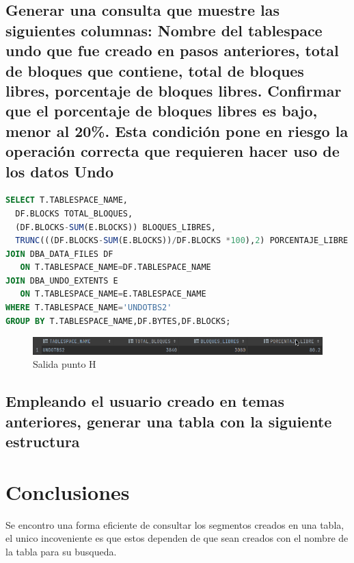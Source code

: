 \documentclass[journal]{IEEEtran}
\begin{document}
\subsection{Generar una consulta que muestre las siguientes columnas: Nombre del tablespace undo que fue creado en pasos anteriores, total de bloques que
contiene, total de bloques libres, porcentaje de bloques libres. Confirmar que el porcentaje de bloques libres es bajo, menor al 20\%. Esta condición
pone en riesgo la operación correcta que requieren hacer uso de los datos Undo}
\begin{lstlisting}[language=sql, caption=sentencia consulta tablespace bloques libres,label={lst:codigo4}]
SELECT T.TABLESPACE_NAME,
  DF.BLOCKS TOTAL_BLOQUES,
  (DF.BLOCKS-SUM(E.BLOCKS)) BLOQUES_LIBRES,
  TRUNC(((DF.BLOCKS-SUM(E.BLOCKS))/DF.BLOCKS *100),2) PORCENTAJE_LIBRE FROM DBA_TABLESPACES T
JOIN DBA_DATA_FILES DF
   ON T.TABLESPACE_NAME=DF.TABLESPACE_NAME
JOIN DBA_UNDO_EXTENTS E
   ON T.TABLESPACE_NAME=E.TABLESPACE_NAME
WHERE T.TABLESPACE_NAME='UNDOTBS2'
GROUP BY T.TABLESPACE_NAME,DF.BYTES,DF.BLOCKS;
\end{lstlisting}
\begin{figure}[H]
  \centering
  \includegraphics[scale=.28]{captura_5.png}
   \caption{Salida punto H}
   \label{fig:validador_5}
\end{figure}

\subsection{Empleando el usuario creado en temas anteriores, generar una tabla con la siguiente estructura}

\section{Conclusiones}
Se encontro una forma eficiente de consultar los segmentos creados en una tabla, 
el unico incoveniente es que estos dependen de que sean creados con el nombre de la tabla 
para su busqueda.
\ifCLASSOPTIONcaptionsoff
  \newpage

\fi
\end{document}
